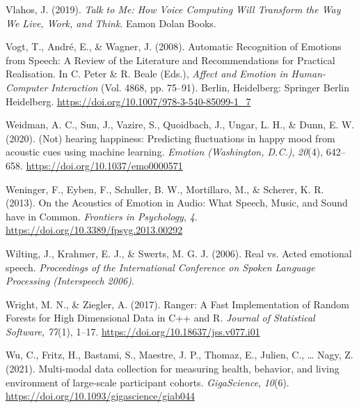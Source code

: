 \documentclass[
  english,
  man,floatsintext]{apa6}
\newlength{\cslhangindent}
\newenvironment{CSLReferences}[2] %
 {%
  \setlength{\parindent}{0pt}
  \ifodd #1 \everypar{\setlength{\hangindent}{\cslhangindent}}\ignorespaces\fi
  \ifnum #2 > 0
  \setlength{\parskip}{#2\baselineskip}
  \fi
 }%
 {}
\begin{document}
\begin{CSLReferences}{1}{0}
\leavevmode{}%
Vlahos, J. (2019). \emph{Talk to {Me}: {How Voice Computing Will Transform} the {Way We Live}, {Work}, and {Think}}. Eamon Dolan Books.

\leavevmode{}%
Vogt, T., André, E., \& Wagner, J. (2008). Automatic {Recognition} of {Emotions} from {Speech}: {A Review} of the {Literature} and {Recommendations} for {Practical Realisation}. In C. Peter \& R. Beale (Eds.), \emph{Affect and {Emotion} in {Human-Computer Interaction}} (Vol. 4868, pp. 75--91). Berlin, Heidelberg: Springer Berlin Heidelberg. \url{https://doi.org/10.1007/978-3-540-85099-1_7}

\leavevmode{}%
Weidman, A. C., Sun, J., Vazire, S., Quoidbach, J., Ungar, L. H., \& Dunn, E. W. (2020). ({Not}) hearing happiness: {Predicting} fluctuations in happy mood from acoustic cues using machine learning. \emph{Emotion (Washington, D.C.)}, \emph{20}(4), 642--658. \url{https://doi.org/10.1037/emo0000571}

\leavevmode{}%
Weninger, F., Eyben, F., Schuller, B. W., Mortillaro, M., \& Scherer, K. R. (2013). On the {Acoustics} of {Emotion} in {Audio}: {What Speech}, {Music}, and {Sound} have in {Common}. \emph{Frontiers in Psychology}, \emph{4}. \url{https://doi.org/10.3389/fpsyg.2013.00292}

\leavevmode{}%
Wilting, J., Krahmer, E. J., \& Swerts, M. G. J. (2006). Real vs. Acted emotional speech. \emph{Proceedings of the International Conference on Spoken Language Processing (Interspeech 2006)}.

\leavevmode{}%
Wright, M. N., \& Ziegler, A. (2017). Ranger: {A Fast Implementation} of {Random Forests} for {High Dimensional Data} in {C}++ and {R}. \emph{Journal of Statistical Software}, \emph{77}(1), 1--17. \url{https://doi.org/10.18637/jss.v077.i01}

\leavevmode{}%
Wu, C., Fritz, H., Bastami, S., Maestre, J. P., Thomaz, E., Julien, C., \ldots{} Nagy, Z. (2021). Multi-modal data collection for measuring health, behavior, and living environment of large-scale participant cohorts. \emph{GigaScience}, \emph{10}(6). \url{https://doi.org/10.1093/gigascience/giab044}

\end{CSLReferences}
\end{document}
